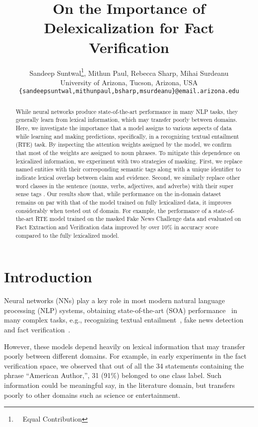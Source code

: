 \documentclass[11pt,a4paper]{article}
\title{On the Importance of Delexicalization for Fact Verification}
\author{Sandeep Suntwal\thanks{~~Equal Contribution}, Mithun Paul\footnotemark[1], Rebecca Sharp, Mihai Surdeanu\\
  University of Arizona, Tucson, Arizona, USA\\
  {\tt \{sandeepsuntwal,mithunpaul,bsharp,msurdeanu\}@email.arizona.edu}
}
\date{}
\begin{document}
\maketitle
\begin{abstract}

While neural networks produce state-of-the-art performance in many NLP tasks, they generally learn from lexical information, which may transfer poorly between domains. Here, we investigate the importance that a model assigns to various aspects of  data while learning and making predictions, 
    specifically, in a recognizing textual entailment (RTE) task. By inspecting the attention weights assigned by the model, we confirm that most of the weights are assigned to noun phrases. To mitigate this dependence on lexicalized information, we experiment with two strategies of masking.  
First, we replace named entities with their corresponding semantic tags along with a unique identifier 
to indicate lexical overlap between claim and evidence.  Second, we similarly replace other word classes in the sentence (nouns, verbs, adjectives, and adverbs)  with their super sense tags \citep{ciaramita2003supersense}.
Our results show that, while performance on the in-domain dataset remains on par with that of the model trained on fully lexicalized data, it improves considerably when tested out of domain. 
For example, the performance of a state-of-the-art RTE model trained on the masked Fake News Challenge \citep{pomerleau2017fake} data and evaluated on Fact Extraction and Verification  \cite{thorne2018fever} data improved by over 10\% in accuracy score compared to the fully lexicalized model.
\end{abstract}

\section{Introduction}

Neural networks (NNs)  play a key role in most modern natural language processing (NLP) systems, obtaining state-of-the-art (SOA) performance~\citep{devlin2018bert, sun2018improving,bohnet2018morphosyntactic} in many complex tasks, e.g., recognizing textual entailment~\citep{kim2018semantic}, fake news detection~\citep{baird2017talos} and fact verification~\citep{nie2018combining}.

However, these models depend heavily on lexical information that may transfer poorly between different domains. For example, in early experiments in the fact verification space, we observed that out of all the 34 statements containing the phrase ``American Author,'', 31 (91\%) belonged to one class label. Such information could be meaningful say, in the literature domain, but transfers poorly to other domains such as science or entertainment. 
\end{document}
